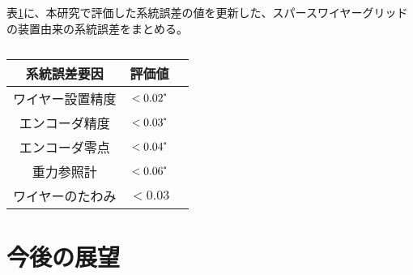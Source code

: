 \documentclass[../../main.tex]{subfiles}
\begin{document}
表\ref{}に、本研究で評価した系統誤差の値を更新した、スパースワイヤーグリッドの装置由来の系統誤差をまとめる。
\begin{table}
    \centering
    \caption{}
    \begin{tabular}{ccc}
        \hline\hline
        系統誤差要因 & 評価値 \\
        \hline
        ワイヤー設置精度 & $<0.02\tcdegree$ \\
        エンコーダ精度 & $<0.03\tcdegree$ \\
        エンコーダ零点 & $<0.04\tcdegree$ \\
        重力参照計 & $<0.06\tcdegree$ \\
        ワイヤーのたわみ & $<0.03$
        \hline
        \hline
    \end{tabular}
\end{table}



\section{今後の展望}
\end{document}
